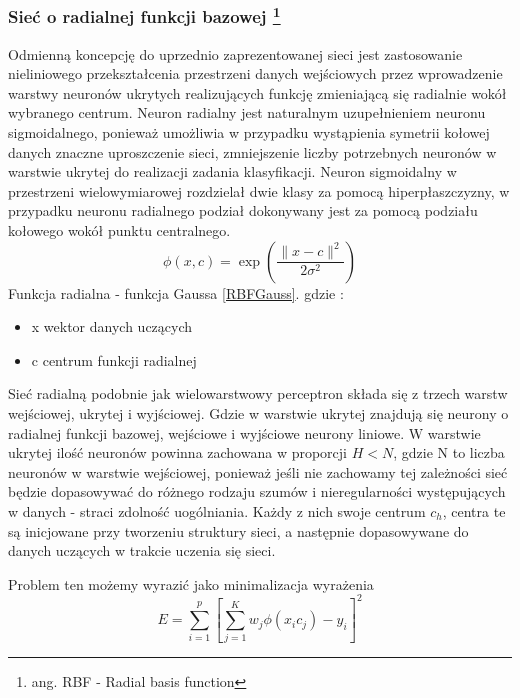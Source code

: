 \documentclass{classrep}
\begin{document}
\subsubsection{Sieć o radialnej funkcji bazowej \footnote{ang. RBF - Radial basis function}}
\label{RBF}

Odmienną koncepcję do uprzednio zaprezentowanej sieci jest zastosowanie nieliniowego przekształcenia przestrzeni danych wejściowych przez wprowadzenie warstwy neuronów ukrytych realizujących funkcję zmieniającą się radialnie wokół wybranego centrum. Neuron radialny jest naturalnym uzupełnieniem neuronu sigmoidalnego, ponieważ umożliwia w przypadku wystąpienia symetrii kołowej danych znaczne uproszczenie sieci, zmniejszenie liczby potrzebnych neuronów w warstwie ukrytej do realizacji zadania klasyfikacji. Neuron sigmoidalny w przestrzeni wielowymiarowej rozdzielał dwie klasy za pomocą hiperpłaszczyzny, w przypadku neuronu radialnego podział dokonywany jest za pomocą podziału kołowego wokół punktu centralnego.
\begin{equation}
\phi (x,c) = \exp \left( \frac{\| x-c \| ^{2}}{2 \sigma ^{2}} \right)
\label{RBFGauss}
\end{equation}
Funkcja radialna - funkcja Gaussa \ref{RBFGauss}.
gdzie :
\begin{itemize}
\item x wektor danych uczących
\item c centrum funkcji radialnej
\end{itemize}

Sieć radialną podobnie jak wielowarstwowy perceptron składa się z trzech warstw wejściowej, ukrytej i wyjściowej. Gdzie w warstwie ukrytej znajdują się neurony o radialnej funkcji bazowej, wejściowe i wyjściowe neurony liniowe. W warstwie ukrytej ilość neuronów powinna zachowana w proporcji $H < N$, gdzie N to liczba neuronów w warstwie wejściowej, ponieważ jeśli nie zachowamy tej zależności sieć będzie dopasowywać do różnego rodzaju szumów i nieregularności występujących w danych - straci zdolność uogólniania. Każdy z nich swoje centrum $c_{h}$, centra te są inicjowane przy tworzeniu struktury sieci, a następnie dopasowywane do danych uczących w trakcie uczenia się sieci.

Problem ten możemy wyrazić jako minimalizacja wyrażenia 
\begin{equation}
E = \sum \limits ^{p} _{i=1} \left[ \sum \limits ^{K} _{j=1} w_j \phi ( x_i c_j) -y_i  \right] ^{2}
\end{equation}
\end{document}
